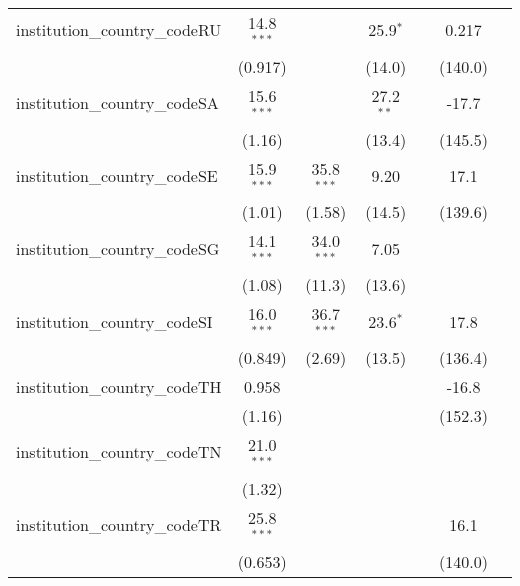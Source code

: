 \begin{tabular}{lcccccc}
   institution\_country\_codeRU          & 14.8$^{***}$  &              & 25.9$^{*}$   &               & 0.217         &   \\   
                                         & (0.917)       &              & (14.0)       &               & (140.0)       &   \\   
   institution\_country\_codeSA          & 15.6$^{***}$  &              & 27.2$^{**}$  &               & -17.7         &   \\   
                                         & (1.16)        &              & (13.4)       &               & (145.5)       &   \\   
   institution\_country\_codeSE          & 15.9$^{***}$  & 35.8$^{***}$ & 9.20         &               & 17.1          &   \\   
                                         & (1.01)        & (1.58)       & (14.5)       &               & (139.6)       &   \\   
   institution\_country\_codeSG          & 14.1$^{***}$  & 34.0$^{***}$ & 7.05         &               &               &   \\   
                                         & (1.08)        & (11.3)       & (13.6)       &               &               &   \\   
   institution\_country\_codeSI          & 16.0$^{***}$  & 36.7$^{***}$ & 23.6$^{*}$   &               & 17.8          &   \\   
                                         & (0.849)       & (2.69)       & (13.5)       &               & (136.4)       &   \\   
   institution\_country\_codeTH          & 0.958         &              &              &               & -16.8         &   \\   
                                         & (1.16)        &              &              &               & (152.3)       &   \\   
   institution\_country\_codeTN          & 21.0$^{***}$  &              &              &               &               &   \\   
                                         & (1.32)        &              &              &               &               &   \\   
   institution\_country\_codeTR          & 25.8$^{***}$  &              &              &               & 16.1          &   \\   
                                         & (0.653)       &              &              &               & (140.0)       &   \\   

\end{tabular}
